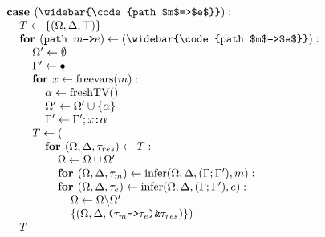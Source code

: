 \documentclass[acmsmall]{acmart}
\begin{document}
\begin{figure*}[h]
\[\begin{array}[t]{@{} l}
    \I \B{case } (\widebar{\code{path $m$=>$e$}})  :  
    \\
    \I\I T \leftarrow \{(\Omega, \Delta, \top)\}
    \\
    \I\I \B{for } (\code{path $m$=>$e$}) \leftarrow (\widebar{\code{path $m$=>$e$}}): 
    \\
    \I\I\I \Omega' \leftarrow \emptyset
    \\
    \I\I\I \Gamma' \leftarrow \bullet
    \\
    \I\I\I \B{for } x \leftarrow \F{freevars}(m):
    \\
    \I\I\I\I \alpha \leftarrow \F{freshTV}() 
    \\
    \I\I\I\I \Omega' \leftarrow \Omega' \cup \{\alpha\} 
    \\
    \I\I\I\I \Gamma' \leftarrow \Gamma';\code{$x$:$\alpha$}
    \\
    \I\I\I T \leftarrow (
    \\
    \I\I\I\I \B{for } (\Omega, \Delta, \tau_{res}) \leftarrow T: 
    \\
    \I\I\I\I\I \Omega \leftarrow \Omega \cup \Omega'
    \\
    \I\I\I\I\I \B{for } (\Omega, \Delta, \tau_{m}) \leftarrow \F{infer}(\Omega, \Delta, (\Gamma;\Gamma'), m): 
    \\
    \I\I\I\I\I \B{for } (\Omega, \Delta, \tau_{e}) \leftarrow \F{infer}(\Omega, \Delta, (\Gamma;\Gamma'), e): 
    \\
    \I\I\I\I\I\I \Omega \leftarrow \Omega \backslash \Omega'
    \\
    \I\I\I\I\I\I \{(\Omega, \Delta, \code{($\tau_{m}$->$\tau_{e}$)\&$\tau_{res}$})\})
    \\
    \I\I T

    \\


\end{array}\]
\end{figure*}
\end{document}
